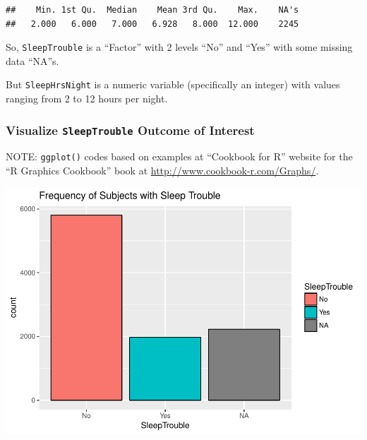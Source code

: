 \documentclass[]{article}
\newenvironment{Shaded}{\begin{snugshade}}{\end{snugshade}}
\newcommand{\KeywordTok}[1]{\textcolor[rgb]{0.13,0.29,0.53}{\textbf{{#1}}}}
\newcommand{\DataTypeTok}[1]{\textcolor[rgb]{0.13,0.29,0.53}{{#1}}}
\newcommand{\StringTok}[1]{\textcolor[rgb]{0.31,0.60,0.02}{{#1}}}
\newcommand{\CommentTok}[1]{\textcolor[rgb]{0.56,0.35,0.01}{\textit{{#1}}}}
\newcommand{\NormalTok}[1]{{#1}}
\begin{document}
\begin{verbatim}
##    Min. 1st Qu.  Median    Mean 3rd Qu.    Max.    NA's 
##   2.000   6.000   7.000   6.928   8.000  12.000    2245
\end{verbatim}

So, \texttt{SleepTrouble} is a ``Factor'' with 2 levels ``No'' and
``Yes'' with some missing data ``NA''s.

But \texttt{SleepHrsNight} is a numeric variable (specifically an
integer) with values ranging from 2 to 12 hours per night.

\subsubsection{\texorpdfstring{Visualize \texttt{SleepTrouble} Outcome
of
Interest}{Visualize SleepTrouble Outcome of Interest}}\label{visualize-sleeptrouble-outcome-of-interest}

NOTE: \texttt{ggplot()} codes based on examples at ``Cookbook for R''
website for the ``R Graphics Cookbook'' book at
\url{http://www.cookbook-r.com/Graphs/}.

\begin{Shaded}
\end{Shaded}

\includegraphics{Hmwk7AnswerKey_files/figure-latex/unnamed-chunk-3-1.pdf}
\end{document}
